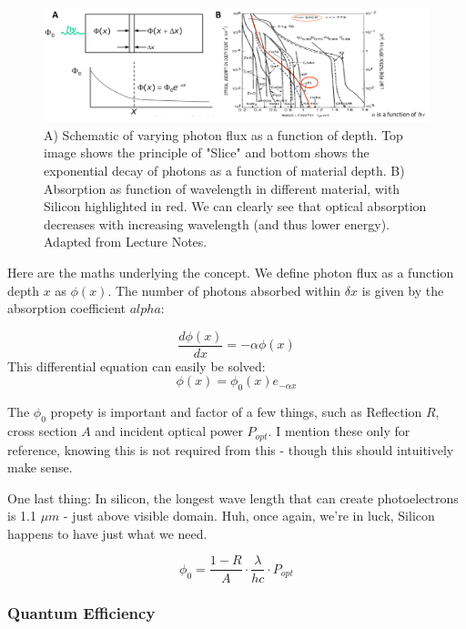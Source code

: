 \begin{figure}[H]
    \centering
    \includegraphics[width=1\linewidth]{../../Figures/Optical_Absorbtion.PNG}
    \caption{A) Schematic of varying photon flux as a function of depth. Top image shows the principle of "Slice" and bottom shows the exponential decay of photons as a function of material depth. B) Absorption as function of wavelength in different material, with Silicon highlighted in red. We can clearly see that optical absorption decreases with increasing wavelength (and thus lower energy). Adapted from Lecture Notes.}
    \label{fig:Optical_Absorbtion}
\end{figure}

Here are the maths underlying the concept. We define photon flux as a function depth $x$ as $\phi(x)$. 
The number of photons absorbed within $\delta x$ is given by the absorption coefficient $alpha$:

\begin{equation}
    \frac{d\phi(x)}{dx} = -\alpha \phi(x)
\end{equation}
This differential equation can easily be solved:
\begin{equation}
    \phi(x) =  \phi_0(x) e_{-\alpha x} 
\end{equation}

The $\phi_0$ propety is important and factor of a few things, such as Reflection $R$, cross section $A$ and incident optical power $P_{opt}$. I mention these only for reference, knowing this is not required from this - though this should intuitively make sense. 

One last thing: In silicon, the longest wave length that can create photoelectrons is 1.1 $\mu m$ - just above visible domain. Huh, once again, we're in luck, Silicon happens to have just what we need. 

\begin{equation}
    \phi_0 = \frac{1-R}{A}\cdot \frac{\lambda}{hc}\cdot P_{opt}
\end{equation}

\subsubsection{Quantum Efficiency}

